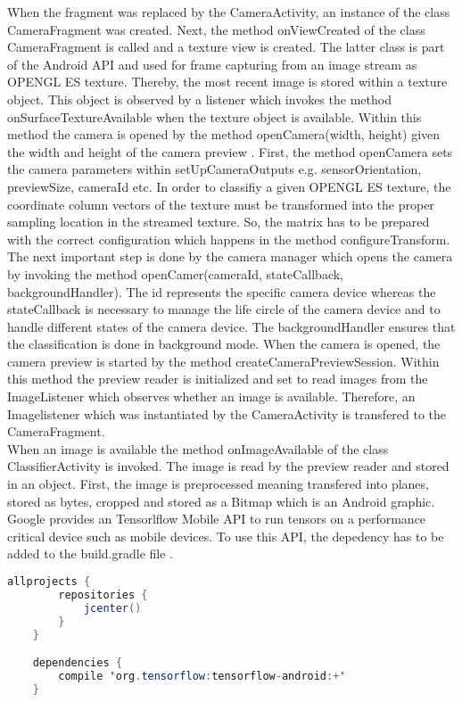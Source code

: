 When the fragment was replaced by the CameraActivity, an instance of the class CameraFragment was created. Next, the method onViewCreated of the class CameraFragment is called and a texture view is created. The latter class is part of the Android API and used for frame capturing from an image stream as OPENGL ES texture. Thereby, the most recent image is stored within a texture object. This object is observed by a listener which invokes the method onSurfaceTextureAvailable when the texture object is available. Within this method the camera is opened by the method openCamera(width, height) given the width and height of the camera preview \citep{AndroidDevelopers}. First, the method openCamera sets the camera parameters within setUpCameraOutputs e.g. sensorOrientation, previewSize, cameraId etc. In order to classifiy a given OPENGL ES texture, the coordinate column vectors of the texture must be transformed into the proper sampling location in the streamed texture. So, the matrix has to be prepared with the correct configuration which happens in the method configureTransform. The next important step is done by the camera manager which opens the camera by invoking the method openCamer(cameraId, stateCallback, backgroundHandler). The id represents the specific camera device whereas the stateCallback is necessary to manage the life circle of the camera device and to handle different states of the camera device. The backgroundHandler ensures that the classification is done in background mode. When the camera is opened, the camera preview is started by the method createCameraPreviewSession. Within this method the preview reader is initialized and set to read images from the ImageListener which observes whether an image is available. Therefore, an Imagelistener which was instantiated by the CameraActivity is transfered to the CameraFragment. \\

When an image is available the method onImageAvailable of the class ClassifierActivity is invoked. The image is read by the preview reader and stored in an object. First, the image is preprocessed meaning transfered into planes, stored as bytes, cropped and stored as a Bitmap which is an Android graphic. Google provides an Tensorlflow Mobile API to run tensors on a performance critical device such as mobile devices. To use this API, the depedency has to be added to the build.gradle file . 

\begin{lstlisting}[caption=Tensorflow API in build.gradle, label=list:tensorflow_api, language=java]
	allprojects {
  		repositories {
        	jcenter()
    	}
	}

	dependencies {
    	compile 'org.tensorflow:tensorflow-android:+'
	}
\end{lstlisting}

